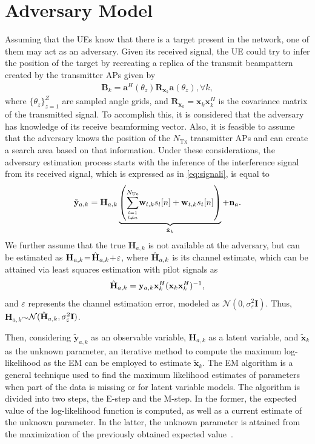 \documentclass[conference,twocolumn,a4paper]{IEEEtran}
\theoremstyle{remark} \newtheorem{remark}{Remark}
\begin{document}
\section{Adversary Model}
Assuming that the UEs know that there is a target present in the network, one of them may act as an adversary. Given its received signal, the UE could try to infer the position of the target by recreating a replica of the transmit beampattern created by the transmitter APs given by
\begin{align}
    \mathbf{B}_k = \mathbf{a}^H(\theta_{z})\mathbf{R}_{\mathbf{x}_k}\mathbf{a}(\theta_{z}), \forall k,
\end{align}
where $\{\theta_z\}^{Z}_{z=1}$ are sampled angle grids, and $\mathbf{R}_{\mathbf{x}_k}$$=$$\mathbf{x}_k\mathbf{x}_k^H$ is the covariance matrix of the transmitted signal. To accomplish this, it is considered that the adversary has knowledge of its receive beamforming vector. Also, it is feasible to assume that the adversary knows the position of the $N_{\mathrm{Tx}}$ transmitter APs and can create a search area based on that information. Under these considerations, the adversary estimation process starts with the inference of the interference signal from its received signal, which is expressed as in \eqref{eq:signali}, is equal to
\begin{align}
     \tilde{\mathbf{y}}_{a,k} = \mathbf{H}_{a,k}\underbrace{\left(\sum_{l=1 \atop l \neq a}^{N_{\mathrm{Ue}}}\!\mathbf{w}_{l,k}s_l[n]+\mathbf{w}_{t,k}s_t[n]\right)}_{\tilde{\mathbf{x}}_k}+\mathbf{n}_a.
 \end{align}
We further assume that the true $\mathbf{H}_{a,k}$ is not available at the adversary, but can be estimated as $\mathbf{H}_{a,k}\!=\!\Hat{\mathbf{H}}_{a,k}\!+\!\varepsilon$, where $\Hat{\mathbf{H}}_{a,k}$ is its channel estimate, which can be attained via least squares estimation with pilot signals as 
\begin{align}
    \Hat{\mathbf{H}}_{a,k} = \mathbf{y}_{a,k}\mathbf{x}_k^H(\mathbf{x}_k\mathbf{x}_k^H)^{-1},
\end{align}
and $\varepsilon$ represents the channel estimation error, modeled as $\mathcal{N}(0,\sigma_\varepsilon^2 \mathbf{I})$. Thus, $\mathbf{H}_{a,k}$$\sim$$\mathcal{N}(\Hat{\mathbf{H}}_{a,k},\sigma_\varepsilon^2 \mathbf{I})$.

Then, considering  $\tilde{\mathbf{y}}_{a,k}$ as an observable variable, $\mathbf{H}_{a,k}$ as a latent variable, and   $\tilde{\mathbf{x}}_k$ as the unknown parameter, an iterative method to compute the maximum log-likelihood as the EM can be employed to estimate $\tilde{\mathbf{x}}_k$. The EM algorithm is a general technique used to find the maximum likelihood estimates of parameters when part of the data is missing or for latent variable models. The algorithm is divided into two steps, the E-step and the M-step. In the former, the expected value of the log-likelihood function is computed, as well as a current estimate of the unknown parameter. In the latter, the unknown parameter is attained from the maximization of the previously obtained expected value~\cite{art:em}.
\end{document}
